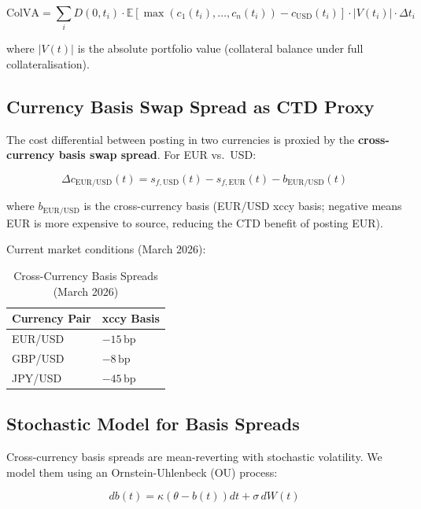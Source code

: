 \documentclass[11pt,a4paper]{article}
\begin{document}
\begin{equation}
\mathrm{ColVA} = \sum_i D(0,t_i)\cdot\mathbb{E}\!\left[\max\!\left(c_1(t_i),\ldots,c_n(t_i)\right) - c_{\mathrm{USD}}(t_i)\right]
\cdot \bigl|V(t_i)\bigr| \cdot \Delta t_i
\tag{3}
\end{equation}

where $|V(t)|$ is the absolute portfolio value (collateral balance under full collateralisation).

\subsection{Currency Basis Swap Spread as CTD Proxy}

The cost differential between posting in two currencies is proxied by the
\textbf{cross-currency basis swap spread}. For EUR vs.\ USD:

\begin{equation}
\Delta c_{\mathrm{EUR/USD}}(t) = s_{f,\mathrm{USD}}(t) - s_{f,\mathrm{EUR}}(t) - b_{\mathrm{EUR/USD}}(t)
\tag{4}
\end{equation}

where $b_{\mathrm{EUR/USD}}$ is the cross-currency basis (EUR/USD xccy basis; negative means
EUR is more expensive to source, reducing the CTD benefit of posting EUR).

Current market conditions (March 2026):

\begin{table}[h!]
\centering
\caption{Cross-Currency Basis Spreads (March 2026)}
\begin{tabular}{@{}ll@{}}
\toprule
\textbf{Currency Pair} & \textbf{xccy Basis} \\
\midrule
EUR/USD & $-15\,\mathrm{bp}$ \\
GBP/USD & $-8\,\mathrm{bp}$  \\
JPY/USD & $-45\,\mathrm{bp}$ \\
\bottomrule
\end{tabular}
\end{table}

\subsection{Stochastic Model for Basis Spreads}

Cross-currency basis spreads are mean-reverting with stochastic volatility. We model them using
an Ornstein-Uhlenbeck (OU) process:

\begin{equation}
d b(t) = \kappa\!\left(\theta - b(t)\right) dt + \sigma\, dW(t)
\tag{5}
\end{equation}
\end{document}
